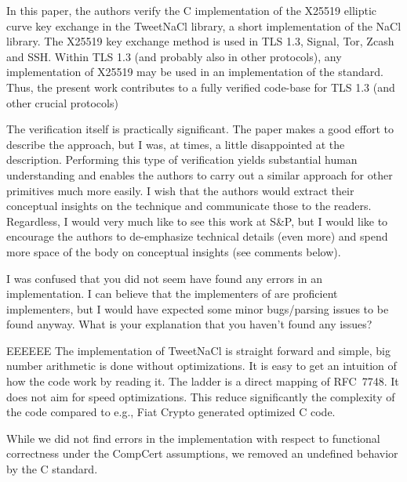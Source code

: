 \begin{center}
\end{center}

In this paper, the authors verify the C implementation of the
X25519 elliptic curve key exchange in the TweetNaCl library,
a short implementation of the NaCl library. The X25519 key
exchange method is used in TLS 1.3, Signal, Tor, Zcash and
SSH. Within TLS 1.3 (and probably also in other protocols),
any implementation of X25519 may be used in an implementation
of the standard. Thus, the present work contributes
to a fully verified code-base for TLS 1.3 (and other crucial
protocols)

The verification itself is practically significant. The paper
makes a good effort to describe the approach, but I was, at
times, a little disappointed at the description. Performing this
type of verification yields substantial human understanding
and enables the authors to carry out a similar approach for
other primitives much more easily. I wish that the authors
would extract their conceptual insights on the technique and
communicate those to the readers. Regardless, I would very
much like to see this work at S\&P, but I would like to encourage
the authors to de-emphasize technical details (even more)
and spend more space of the body on conceptual insights (see
comments below).


\begin{center}
\end{center}

I was confused that you did not seem have found any errors
in an implementation. I can believe that the implementers
of \cite{BGJ+15} are proficient implementers, but I would have expected
some minor bugs/parsing issues to be found anyway. What is
your explanation that you haven’t found any issues?

\begin{answer}{EEEEEE}
The implementation of TweetNaCl is straight forward and
simple, big number arithmetic is done without optimizations.
It is easy to get an intuition of how the code work by reading
it. The ladder is a direct mapping of RFC~7748. It does
not aim for speed optimizations. This reduce significantly
the complexity of the code compared to e.g., Fiat Crypto
generated optimized C code.

While we did not find errors in the implementation with
respect to functional correctness under the CompCert assumptions,
we removed an undefined behavior by the C
standard.
\end{answer}

